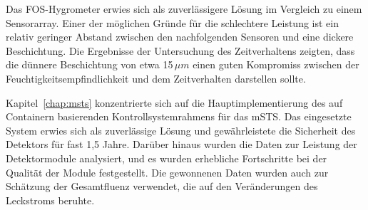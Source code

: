 Das \gls{FOS}-Hygrometer erwies sich als zuverlässigere Lösung im Vergleich zu einem Sensorarray. Einer der möglichen Gründe für die schlechtere Leistung ist ein relativ geringer Abstand zwischen den nachfolgenden Sensoren und eine dickere Beschichtung. Die Ergebnisse der Untersuchung des Zeitverhaltens zeigten, dass die dünnere Beschichtung von etwa 15\,$\mu m$ einen guten Kompromiss zwischen der Feuchtigkeitsempfindlichkeit und dem Zeitverhalten darstellen sollte. 

Kapitel~\ref{chap:msts} konzentrierte sich auf die Hauptimplementierung des auf Containern basierenden Kontrollsystemrahmens für das \gls{mSTS}. Das eingesetzte System erwies sich als zuverlässige Lösung und gewährleistete die Sicherheit des Detektors für fast 1,5 Jahre. Darüber hinaus wurden die Daten zur Leistung der Detektormodule analysiert, und es wurden erhebliche Fortschritte bei der Qualität der Module festgestellt. Die gewonnenen Daten wurden auch zur Schätzung der Gesamtfluenz verwendet, die auf den Veränderungen des Leckstroms beruhte. 